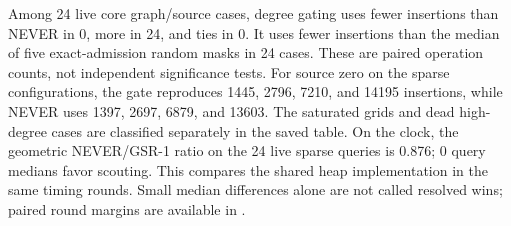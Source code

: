 Among 24 live core graph/source cases, degree gating uses fewer insertions than NEVER in 0, more in 24, and ties in 0. It uses fewer insertions than the median of five exact-admission random masks in 24 cases. These are paired operation counts, not independent significance tests. For source zero on the sparse configurations, the gate reproduces 1445, 2796, 7210, and 14195 insertions, while NEVER uses 1397, 2697, 6879, and 13603. The saturated grids and dead high-degree cases are classified separately in the saved table.
On the clock, the geometric NEVER/GSR-1 ratio on the 24 live sparse queries is 0.876; 0 query medians favor scouting. This compares the shared heap implementation in the same timing rounds. Small median differences alone are not called resolved wins; paired round margins are available in .
